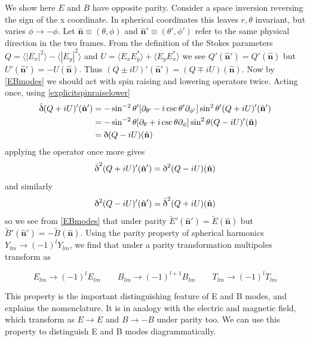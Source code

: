 \documentclass[a4paper,10pt]{article}
\renewcommand{\v}[1]{\mathbf{#1}}
\newcommand{\unit}[1]{\hat{\v{#1}}}
\newcommand{\sr}{\text{\normalfont\dh}}
\renewcommand{\sl}{\bar{\text{\normalfont\dh}}}
\begin{document}
We show here $E$ and $B$ have opposite parity. Consider a space inversion reversing the sign of the x coordinate. In spherical coordinates this leaves $r, \theta$ invariant, but varies $\phi \rightarrow -\phi$.  Let $\unit{n}\equiv(\theta, \phi)$ and $\unit{n}'\equiv(\theta', \phi')$ refer to the same physical direction in the two frames. From the definition of the Stokes parameters $Q=\langle |E_x|^2 \rangle - \langle |E_y|^2 \rangle$ and $U = \langle E_xE_y^* \rangle + \langle E_yE_x^* \rangle$ we see $Q'(\unit{n}') = Q'(\unit{n})$ but $U'(\unit{n}') = -U(\unit{n})$. Thus $(Q\pm iU)'(\unit{n}') = (Q\mp iU)(\unit{n})$. Now by \ref{EBmodes} we should act with spin raising and lowering operators twice. Acting once, using \ref{explicitspinraiselower}
\begin{equation}\begin{split}
\sl(Q+iU)'(\unit{n}') &= -\sin^{-2}{\theta'}[\partial_{\theta'}-i\csc{\theta'}\partial_{\phi'}]\sin^{2}{\theta'}(Q+iU)'(\unit{n}')\\
&= -\sin^{-2}{\theta}[\partial_{\theta}+i\csc{\theta}\partial_{\phi}]\sin^{2}{\theta}(Q-iU)'(\unit{n})\\
&= \sr (Q-iU)(\unit{n})
\end{split}\end{equation}
applying the operator once more gives
\begin{equation}
\sl^2(Q+iU)'(\unit{n}') = \sr^2 (Q-iU)(\unit{n})
\end{equation}
and similarly
\begin{equation}
\sr^2(Q-iU)'(\unit{n}') = \sl^2 (Q+iU)(\unit{n})
\end{equation}
so we see from \ref{EBmodes} that under parity $\tilde{E}'(\unit{n}')=\tilde{E}(\unit{n})$ but $\tilde{B}'(\unit{n}')=-\tilde{B}(\unit{n})$. Using the parity property of spherical harmonics $Y_{lm}\rightarrow(-1)^lY_{lm}$, we find that under a parity transformation multipoles transform as

\begin{equation}
E_{lm} \rightarrow (-1)^lE_{lm} \qquad B_{lm} \rightarrow (-1)^{l+1}B_{lm} \qquad T_{lm} \rightarrow (-1)^lT_{lm}
\end{equation} 

This property is the important distinguishing feature of E and B modes, and explains the nomenclature. It is in analogy with the electric and magnetic field, which transform as $E\rightarrow E$ and $B\rightarrow -B$ under parity too. We can use this property to distinguish E and B modes diagrammatically.
\end{document}
